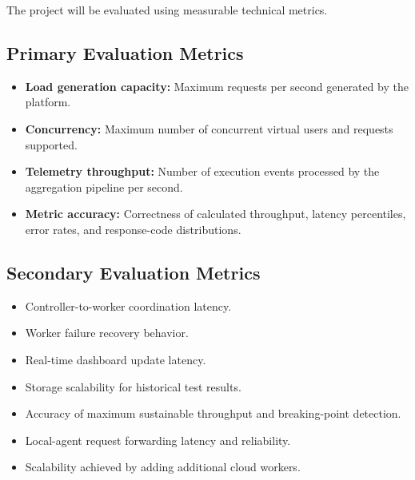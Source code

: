 \documentclass[11pt,a4paper]{article}
\begin{document}
The project will be evaluated using measurable technical metrics.

\subsection{Primary Evaluation Metrics}

\begin{itemize}[leftmargin=0.7cm]

    \item \textbf{Load generation capacity:} Maximum requests per
    second generated by the platform.

    \item \textbf{Concurrency:} Maximum number of concurrent virtual
    users and requests supported.

    \item \textbf{Telemetry throughput:} Number of execution events
    processed by the aggregation pipeline per second.

    \item \textbf{Metric accuracy:} Correctness of calculated
    throughput, latency percentiles, error rates, and response-code
    distributions.

\end{itemize}

\subsection{Secondary Evaluation Metrics}

\begin{itemize}[leftmargin=0.7cm]

    \item Controller-to-worker coordination latency.

    \item Worker failure recovery behavior.

    \item Real-time dashboard update latency.

    \item Storage scalability for historical test results.

    \item Accuracy of maximum sustainable throughput and breaking-point
    detection.

    \item Local-agent request forwarding latency and reliability.

    \item Scalability achieved by adding additional cloud workers.

\end{itemize}
\end{document}
